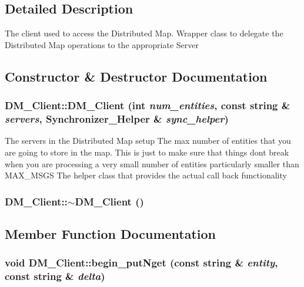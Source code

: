 \subsection{Detailed Description}
The client used to access the Distributed Map. Wrapper class to delegate the Distributed Map operations to the appropriate Server 

\subsection{Constructor \& Destructor Documentation}
\hypertarget{class_d_m___client_a4366fbc81789bd7b4ba0f681ad4b7c0e}{
\subsubsection[{DM\_\-Client}]{\setlength{\rightskip}{0pt plus 5cm}DM\_\-Client::DM\_\-Client (int {\em num\_\-entities}, \/  const string \& {\em servers}, \/  {\bf Synchronizer\_\-Helper} \& {\em sync\_\-helper})}}
\label{class_d_m___client_a4366fbc81789bd7b4ba0f681ad4b7c0e}
The servers in the Distributed Map setup The max number of entities that you are going to store in the map. This is just to make sure that things dont break when you are processing a very small number of entities particularly smaller than MAX\_\-MSGS The helper class that provides the actual call back functionality \hypertarget{class_d_m___client_a7c4036aa31873a238dca15210d4c15bc}{
\subsubsection[{$\sim$DM\_\-Client}]{\setlength{\rightskip}{0pt plus 5cm}DM\_\-Client::$\sim$DM\_\-Client ()}}
\label{class_d_m___client_a7c4036aa31873a238dca15210d4c15bc}


\subsection{Member Function Documentation}
\hypertarget{class_d_m___client_a55c5ec85e4e670a6ec5a4da71e4d50cf}{
\subsubsection[{begin\_\-putNget}]{\setlength{\rightskip}{0pt plus 5cm}void DM\_\-Client::begin\_\-putNget (const string \& {\em entity}, \/  const string \& {\em delta})}}
\label{class_d_m___client_a55c5ec85e4e670a6ec5a4da71e4d50cf}


